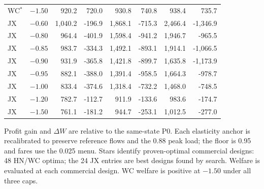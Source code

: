 \begin{table}[p]
\begin{minipage}{.95\textwidth}
\begin{tabular*}{\linewidth}{@{\extracolsep{\fill}}llrrrrrr@{}}
WC$^{*}$ & $-1.50$ & 920.2 & 720.0 & 930.8 & 740.8 & 938.4 & 735.7 \\
\addlinespace
JX & $-0.60$ & 1,040.2 & -196.9 & 1,868.1 & -715.3 & 2,466.4 & -1,346.9 \\
JX & $-0.80$ & 964.4 & -401.9 & 1,598.4 & -941.2 & 1,946.7 & -965.5 \\
JX & $-0.85$ & 983.7 & -334.3 & 1,492.1 & -893.1 & 1,914.1 & -1,066.5 \\
JX & $-0.90$ & 931.9 & -365.8 & 1,421.8 & -899.7 & 1,635.8 & -1,173.9 \\
JX & $-0.95$ & 882.1 & -388.0 & 1,391.4 & -958.5 & 1,664.3 & -978.7 \\
JX & $-1.00$ & 833.4 & -374.6 & 1,318.4 & -732.2 & 1,468.0 & -748.5 \\
JX & $-1.20$ & 782.7 & -112.7 & 911.9 & -133.6 & 983.6 & -174.7 \\
JX & $-1.50$ & 761.1 & -181.2 & 944.7 & -253.1 & 1,012.5 & -277.0 \\
\bottomrule\end{tabular*}\par\medskip
\par\noindent Profit gain and $\Delta W$ are relative to the same-state P0. Each elasticity anchor is recalibrated to preserve reference flows and the 0.88 peak load; the floor is 0.95 and fares use the 0.025 menu. Stars identify proven-optimal commercial designs: 48 HN/WC optima; the 24 JX entries are best designs found by search. Welfare is evaluated at each commercial design. WC welfare is positive at $-1.50$ under all three caps.
\end{minipage}\end{table}
